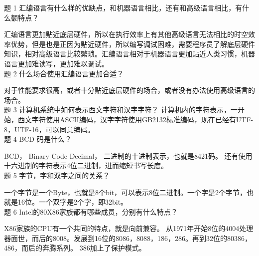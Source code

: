 \documentclass{ctexart}
\begin{document}
题 1 汇编语言有什么样的优缺点，和机器语言相比，还有和高级语言相比，有什么额特点？

汇编语言更加贴近底层硬件，所以在执行效率上有其他高级语言无法相比的时空效率优势，但是也是正因为贴近硬件，所以编写调试困难，需要程序员了解底层硬件知识，相对高级语言比较繁琐。汇编语言相对于机器语言更加贴近人类习惯，机器语言更加难读写，更加难以调试。
~\\

题 2 什么场合使用汇编语言更加合适？

对于性能要求很高，或者十分贴近底层硬件的场合，或者没有办法使用高级语言的场合。
~\\ 

题 3 计算机系统中如何表示西文字符和汉字字符？
计算机内的字符表示，一开始，西文字符使用ASCII编码，汉字字符使用GB2132标准编码，现在已经有UTF-8，UTF-16，可以同意编码。
~\\

题 4 BCD 码是什么？

BCD， Binary Code Decimal， 二进制的十进制表示，也就是8421码。
还有使用十六进制的字符表示4位二进制，进而缩短书写长度。
~\\

题 5 字节，字和双字之间的关系？

一个字节是一个Byte，也就是8个bit，可以表示8位二进制。一个字是2个字节，也就是16位。一个双字是2个字，即32bit。
~\\

题 6 Intel的80X86家族都有哪些成员，分别有什么特点？

X86家族的CPU有一个共同的特点，就是向前兼容。
从1971年开始8位的4004处理器面世，而后的8008。发展到16位的8086，8088，186，286。再到32位的80386，486，而后的奔腾系列。
386加上了保护模式。
\end{document}
